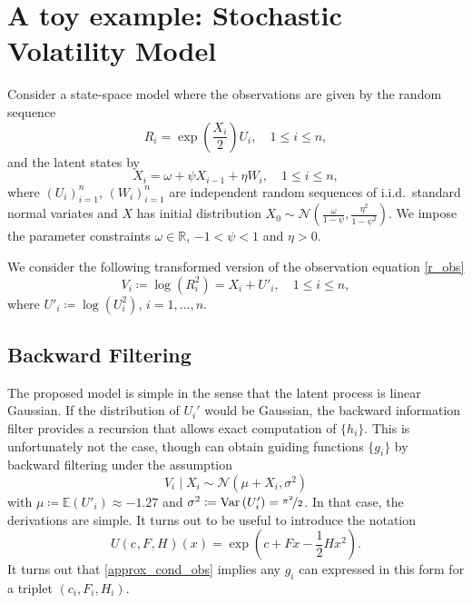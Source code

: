 \documentclass[11pt,reqno]{amsart}
\theoremstyle{definition}
\def \Var {\text{Var}}
\def \R {\mathbb{R}}
\def \E {\mathbb{E}}
\def \Ncal {\mathcal{N}}
\newcommand{\Ufunx}[2]{U\left(c_{#1}^{#2}, F_{#1}^{#2}, H_{#1}^{#2}\right)(x)}
\begin{document}
\section{A toy example: Stochastic Volatility Model}
Consider a state-space model where the observations are given by the random sequence
\begin{equation}\label{r_obs}
    R_i = \exp\left(\frac{X_i}{2}\right) U_i, \quad 1 \leq i \leq n,
\end{equation}
and the latent states by
\begin{equation}\label{latent}
    X_i = \omega + \psi X_{i - 1} + \eta W_i, \quad 1 \leq i \leq n,
\end{equation}
where $(U_i)_{i = 1}^n$, $(W_i)_{i = 1}^n$ are independent random sequences of i.i.d.\ standard normal variates and $X$ has initial distribution $X_0 \sim \Ncal\left(\frac{\omega}{1 - \psi}, \frac{\eta^2}{1 - \psi^2}\right)$. We impose the parameter constraints $\omega \in \R$, $-1 < \psi < 1$ and $\eta > 0$.


We consider the following transformed version of the observation equation \eqref{r_obs}
\begin{equation}\label{v_obs}
    V_i \coloneqq \log\left(R_i^2\right) = X_i + U'_i, \quad 1 \leq i \leq n,
\end{equation}
where $U'_i \coloneqq \log\left(U_i^2\right)$, $i = 1, \dots, n$.

\subsection{Backward Filtering}
The proposed model is simple in the sense that the latent process is linear Gaussian. 
If the distribution of $U_i'$ would be Gaussian, the backward information filter provides a recursion that allows exact computation of $\{h_i\}$. This is unfortunately not the case, though can  obtain guiding functions  $\{g_i\}$ by backward filtering under the assumption
\begin{equation}\label{approx_cond_obs}
    V_i \mid X_i\sim \Ncal\left(\mu + X_i, \sigma^2\right)
\end{equation}
 with $\mu \coloneqq \E\left(U'_i\right) \approx -1.27$ and $\sigma^2 \coloneqq \Var\left(U'_i\right) = \nicefrac{\pi^2}{2}$.
In that case, the derivations are simple. It turns out to be useful to introduce the notation
\begin{equation}\label{Ufun}
    \Ufunx{}{} = \exp\left(c + Fx - \frac{1}{2}Hx^2\right).
\end{equation}
It turns out that \eqref{approx_cond_obs} implies any $g_i$ can expressed in this form for a triplet $(c_i, F_i, H_i)$. 
\end{document}
